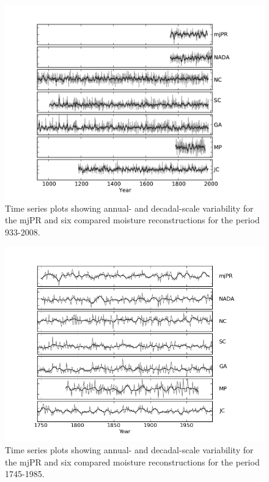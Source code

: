 \begin{figure}
\centering
\includegraphics[width=5in]{figures/reconsStacked.png}
\caption{Time series plots showing annual- and decadal-scale variability for the mjPR and six compared moisture reconstructions for the period 933-2008.}
\label{fig:allRecons}
\end{figure}

\begin{figure}
\centering
\includegraphics[width=5in]{figures/reconsStackedZoom.png}
\caption{Time series plots showing annual- and decadal-scale variability for the mjPR and six compared moisture reconstructions for the period 1745-1985.}
\label{fig:allReconsZoom}
\end{figure}


